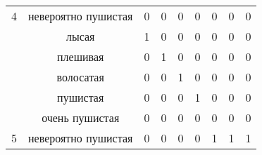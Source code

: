 \begin{table}[H]
\begin{tabular}{|c|c|ccccccc|}
		\multirow{-6}{*}{{\color[HTML]{333333} 4}}                                 & {\color[HTML]{333333} невероятно пушистая} & \multicolumn{1}{c|}{{\color[HTML]{333333} 0}} & \multicolumn{1}{c|}{{\color[HTML]{333333} 0}} & \multicolumn{1}{c|}{0}     & \multicolumn{1}{c|}{0}      & \multicolumn{1}{c|}{0}      & \multicolumn{1}{c|}{0}        & \multicolumn{1}{c|}{0}                       \\ \cline{1-9}
		{\color[HTML]{333333} }                                                    & лысая                                 & \multicolumn{1}{c|}{1}                        & \multicolumn{1}{c|}{0}                        & \multicolumn{1}{c|}{0}     & \multicolumn{1}{c|}{0}      & \multicolumn{1}{c|}{0}      & \multicolumn{1}{c|}{0}        & \multicolumn{1}{c|}{0}  \\ \cline{2-9}
		{\color[HTML]{333333} }                                                    & {\color[HTML]{333333} плешивая}    & \multicolumn{1}{c|}{{\color[HTML]{333333} 0}} & \multicolumn{1}{c|}{{\color[HTML]{333333} 1}} & \multicolumn{1}{c|}{0}      & \multicolumn{1}{c|}{0}      & \multicolumn{1}{c|}{0}      & \multicolumn{1}{c|}{0}        & \multicolumn{1}{c|}{0}                       \\ \cline{2-9}
		{\color[HTML]{333333} }                                                    & {\color[HTML]{333333} волосатая}    & \multicolumn{1}{c|}{{\color[HTML]{333333} 0}} & \multicolumn{1}{c|}{{\color[HTML]{333333} 0}} & \multicolumn{1}{c|}{1}     & \multicolumn{1}{c|}{0}      & \multicolumn{1}{c|}{0}      & \multicolumn{1}{c|}{0}        & \multicolumn{1}{c|}{0}                       \\ \cline{2-9}
		{\color[HTML]{333333} }                                                    & {\color[HTML]{333333} пушистая}             & \multicolumn{1}{c|}{{\color[HTML]{333333} 0}} & \multicolumn{1}{c|}{{\color[HTML]{333333} 0}} & \multicolumn{1}{c|}{0}     & \multicolumn{1}{c|}{1}      & \multicolumn{1}{c|}{0}      & \multicolumn{1}{c|}{0}        & \multicolumn{1}{c|}{0}                       \\ \cline{2-9}
		{\color[HTML]{333333} }                                                    & {\color[HTML]{333333} очень пушистая}       & \multicolumn{1}{c|}{{\color[HTML]{333333} 0}} & \multicolumn{1}{c|}{{\color[HTML]{333333} 0}} & \multicolumn{1}{c|}{0}     & \multicolumn{1}{c|}{0}      & \multicolumn{1}{c|}{0}      & \multicolumn{1}{c|}{0}        & \multicolumn{1}{c|}{0}                       \\ \cline{2-9}
		\multirow{-6}{*}{{\color[HTML]{333333} 5}}                                 & {\color[HTML]{333333} невероятно пушистая} & \multicolumn{1}{c|}{{\color[HTML]{333333} 0}} & \multicolumn{1}{c|}{{\color[HTML]{333333} 0}} & \multicolumn{1}{c|}{0}     & \multicolumn{1}{c|}{0}      & \multicolumn{1}{c|}{1}      & \multicolumn{1}{c|}{1}        & \multicolumn{1}{c|}{1}                       \\ \cline{1-9}
	\end{tabular}
\end{table}



